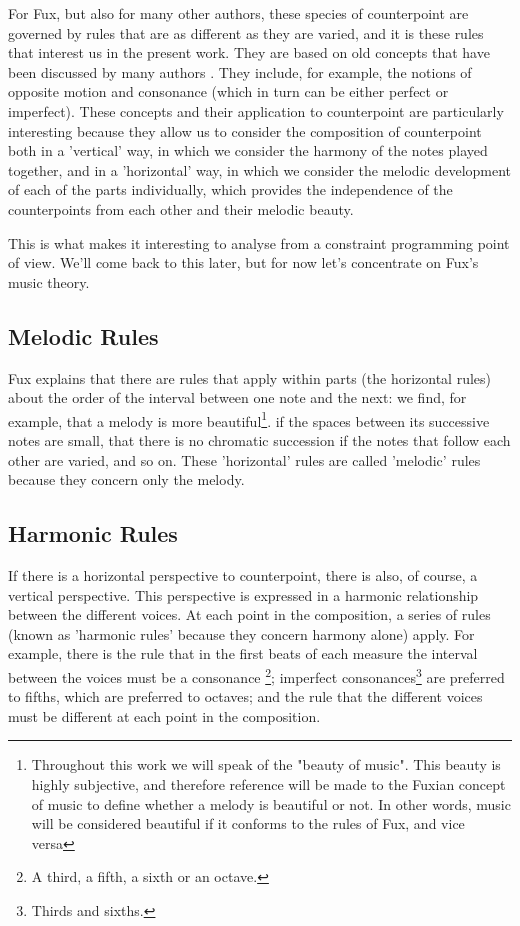 For Fux, but also for many other authors, these species of counterpoint are governed by rules that are as different as they are varied, and it is these rules that interest us in the present work. They are based on old concepts that have been discussed by many authors \cite{crocker1962}. They include, for example, the notions of opposite motion and consonance (which in turn can be either perfect or imperfect). These concepts and their application to counterpoint are particularly interesting because they allow us to consider the composition of counterpoint both in a 'vertical' way, in which we consider the harmony of the notes played together, and in a 'horizontal' way, in which we consider the melodic development of each of the parts individually, which provides the independence of the counterpoints from each other and their melodic beauty.

This is what makes it interesting to analyse from a constraint programming point of view. We'll come back to this later, but for now let's concentrate on Fux's music theory.


\subsection{Melodic Rules}

Fux explains that there are rules that apply within parts (the horizontal rules) about the order of the interval between one note and the next: we find, for example, that a melody is more beautiful\footnote{Throughout this work we will speak of the "beauty of music". This beauty is highly subjective, and therefore reference will be made to the Fuxian concept of music to define whether a melody is beautiful or not. In other words, music will be considered beautiful if it conforms to the rules of Fux, and vice versa}. if the spaces between its successive notes are small, that there is no chromatic succession if the notes that follow each other are varied, and so on. These 'horizontal' rules are called 'melodic' rules because they concern only the melody.


\subsection{Harmonic Rules}


If there is a horizontal perspective to counterpoint, there is also, of course, a vertical perspective. This perspective is expressed in a harmonic relationship between the different voices. At each point in the composition, a series of rules (known as 'harmonic rules' because they concern harmony alone) apply. For example, there is the rule that in the first beats of each measure the interval between the voices must be a consonance \footnote{A third, a fifth, a sixth or an octave.}; imperfect consonances\footnote{Thirds and sixths.} are preferred to fifths, which are preferred to octaves; and the rule that the different voices must be different at each point in the composition.

